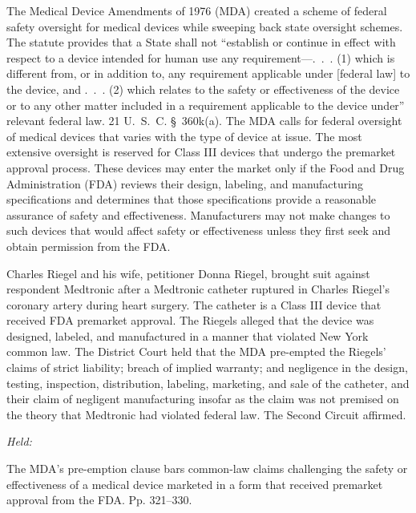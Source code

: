 
\setcounter{page}{312}

\noindent The Medical Device Amendments of 1976 (MDA) created a scheme of federal
safety oversight for medical devices while sweeping back state oversight
schemes. The statute provides that a State shall not ``establish or
continue in effect with respect to a device intended for human use
any requirement---.~.~. (1) which is different from, or in addition
to, any requirement applicable under [federal law] to the device, and
.~.~. (2) which relates to the safety or effectiveness of the device
or to any other matter included in a requirement applicable to the
device under'' relevant federal law. 21 U.~S.~C. \S~360k(a). The
MDA calls for federal oversight of medical devices that varies with the
type of device at issue. The most extensive oversight is reserved for
Class III devices that undergo the premarket approval process. These
devices may enter the market only if the Food and Drug Administration
(FDA) reviews their design, labeling, and manufacturing specifications
and determines that those specifications provide a reasonable assurance
of safety and effectiveness. Manufacturers may not make changes to such
devices that would affect safety or effectiveness unless they first seek
and obtain permission from the FDA.

  Charles Riegel and his wife, petitioner Donna Riegel, brought suit
against respondent Medtronic after a Medtronic catheter ruptured in
Charles Riegel's coronary artery during heart surgery. The catheter
is a Class III device that received FDA premarket approval. The Riegels
alleged that the device was designed, labeled, and manufactured in
a manner that violated New York common law. The District Court held
that the MDA pre-empted the Riegels' claims of strict liability;
breach of implied warranty; and negligence in the design, testing,
inspection, distribution, labeling, marketing, and sale of the catheter,
and their claim of negligent manufacturing insofar as the claim was not
premised on the theory that Medtronic had violated federal law. The
Second Circuit affirmed.

\emph{Held:}

  The MDA's pre-emption clause bars common-law claims challenging the
safety or effectiveness of a medical device marketed in a form that
received premarket approval from the FDA. Pp. 321--330. \newpage 

